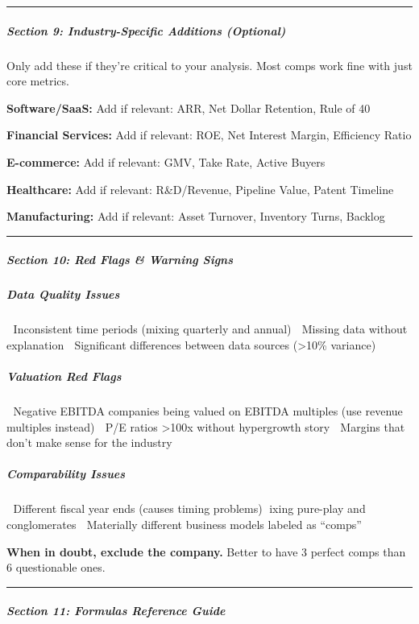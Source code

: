 \documentclass[11pt]{article}
\begin{document}
\vspace{0.5em}\hrule\vspace{0.5em}

\subparagraph{Section 9: Industry-Specific Additions (Optional)}\mbox{}\par

Only add these if they're critical to your analysis. Most comps work fine with just core metrics.


\textbf{Software/SaaS:} Add if relevant: ARR, Net Dollar Retention, Rule of 40


\textbf{Financial Services:} Add if relevant: ROE, Net Interest Margin, Efficiency Ratio


\textbf{E-commerce:} Add if relevant: GMV, Take Rate, Active Buyers


\textbf{Healthcare:} Add if relevant: R\&D/Revenue, Pipeline Value, Patent Timeline


\textbf{Manufacturing:} Add if relevant: Asset Turnover, Inventory Turns, Backlog


\vspace{0.5em}\hrule\vspace{0.5em}

\subparagraph{Section 10: Red Flags \& Warning Signs}\mbox{}\par

\subparagraph{Data Quality Issues}\mbox{}\par
🚩 Inconsistent time periods (mixing quarterly and annual) 🚩 Missing data without explanation 🚩 Significant differences between data sources (>10\% variance)


\subparagraph{Valuation Red Flags}\mbox{}\par
🚩 Negative EBITDA companies being valued on EBITDA multiples (use revenue multiples instead) 🚩 P/E ratios >100x without hypergrowth story 🚩 Margins that don't make sense for the industry


\subparagraph{Comparability Issues}\mbox{}\par
🚩 Different fiscal year ends (causes timing problems) 🚩ixing pure-play and conglomerates 🚩 Materially different business models labeled as ``comps''


\textbf{When in doubt, exclude the company.} Better to have 3 perfect comps than 6 questionable ones.


\vspace{0.5em}\hrule\vspace{0.5em}

\subparagraph{Section 11: Formulas Reference Guide}\mbox{}\par
\end{document}
